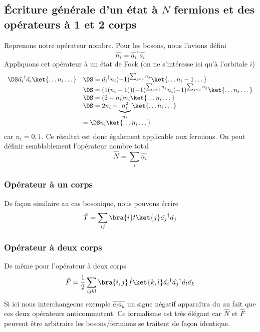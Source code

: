 \subsection{Écriture générale d'un état à $N$ fermions et des opérateurs à 1 et 2 corps}
Reprenons notre opérateur nombre. Pour les bosons, nous l'avions défini 
\begin{equation}
\hat{n_i} = \hat{a_i}^\dagger\hat{a_i}
\end{equation}
Appliquons cet opérateur à un état de Fock (on ne s'intéresse ici qu'à l'orbitale $i$)
\begin{equation}
\begin{array}{ll}
\DS\hat{a_i}^\dagger\hat{a_i}\ket{\dots n_i\dots} &\DS= \hat{a_i}^\dagger n_i(-1)^{\sum_{j<i}n_j}\ket{\dots
 n_i-1\dots}\\
&\DS=(1(n_i-1))(-1)^{\sum_{j<i}n_j} n_i(-1)^{\sum_{j<i}n_j}\ket{\dots n_i\dots}\\
&\DS=(2-n_i)n_i\ket{\dots n_i\dots}\\
&\DS=2n_i-\underbrace{n_i^2}_{n_i}\ket{\dots n_i\dots}\\
&=\DS n_i\ket{\dots n_i\dots}
\end{array}
\end{equation}
car $n_i=0,1$. Ce résultat est donc également applicable aux fermions. On peut définir semblablement 
l'opérateur nombre total
\begin{equation}
\hat{N}=\sum_i\hat{n_i}
\end{equation}


\subsubsection{Opérateur à un corps}
De façon similaire au cas bosonique, nous pouvons écrire
\begin{equation}
\hat{T} =\sum_{ij}\bra{i}t\ket{j}\hat{a_j}^\dagger\hat{a_j}
\end{equation}

\subsubsection{Opérateur à deux corps}
De même pour l'opérateur à deux corps
\begin{equation}
\hat{F} = \frac{1}{2}\sum_{ijkl} \bra{i,j}\hat{f}\ket{k,l}\hat{a_i}^\dagger\hat{a_j}^\dagger\hat{a_l}\hat{a_k}
\end{equation}
Si ici nous interchangeons exemple $\hat{a_l}\hat{a_k}$ un signe négatif apparaîtra du au fait que ces 
deux opérateurs anticommutent. Ce formalisme est très élégant car $\hat{N}$ et $\hat{F}$ peuvent être 
arbitraire les bosons/fermions se traitent de façon identique.


